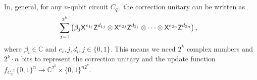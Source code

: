 In, general, for any $n$-qubit circuit $C_q,$  the correction unitary can be written as $$\sum_{j=1}^{2^k} \left(\beta_j {\sf X}^{e_{1j}}{\sf Z}^{d_{1j}}\otimes {\sf X}^{e_{2j}}{\sf Z}^{d_{2j}}\otimes \cdots  \otimes  {\sf X}^{e_{2n}}{\sf Z}^{d_{2n}}\right),$$
where $\beta_i\in \mathbb{C}$ and  $ e_i,j,d_i,j \in \{0,1\}.$  This means we need $2^k$ complex numbers and $2^k\cdot n$ bits to represent the correction unitary and the update function $f_{C_q}:\{0,1\}^n\longrightarrow \mathbb{C}^{2^k}\times \{0,1\}^{n2^{k}}.$ 
%
%
%
% 
% 



